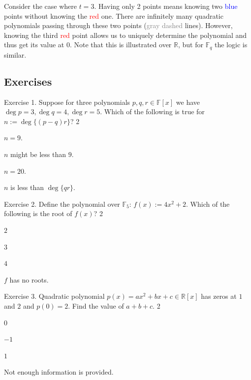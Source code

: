 \documentclass[../lecture-notes-148x210.tex]{subfiles}
\begin{document}
Consider the case where $t = 3$. Having only 2 points means knowing two \textcolor{blue}{blue} 
points without knowing the \textcolor{red}{red} one. There are infinitely many quadratic 
polynomials passing through these two points (\textcolor{gray}{gray dashed} lines). 
However, knowing the third \textcolor{red}{red} point allows us to uniquely determine 
the polynomial and thus get its value at $0$. Note that this is illustrated over 
$\mathbb{R}$, but for $\mathbb{F}_q$ the logic is similar.

\subsection{Exercises}

\begin{xexercise}
    {Exercise 1.}
    {
        Suppose for three polynomials $p,q,r \in \mathbb{F}[x]$ we have $\deg p = 3, \deg q = 4, \deg r = 5$. 
        Which of the following is true for $n := \deg \{(p-q)r\}$?
        \vspace{-3.5mm}
    }
    {2}
    {
        \item $n = 9$.
        \item $n$ might be less than $9$.
        \item $n = 20$.
        \item $n$ is less than $\deg \{qr\}$. 
    }
\end{xexercise}

\begin{xexercise}
    {Exercise 2.}
    {
        Define the polynomial over $\mathbb{F}_5$: $f(x) := 4x^2 + 2$. Which of the following is the root of $f(x)$?
    }
    {2}
    {
        \item $2$
        \item $3$
        \item $4$
        \item $f$ has no roots.
    }
\end{xexercise}

\begin{xexercise}
    {Exercise 3.}
    {
        Quadratic polynomial $p(x) = ax^2+bx+c \in \mathbb{R}[x]$ has zeros at $1$ and $2$ and $p(0) = 2$. 
        Find the value of $a+b+c$.
    }
    {2}
    {
        \item $0$
        \item $-1$
        \item $1$
        \item Not enough information is provided.
    }
\end{xexercise}
\end{document}

